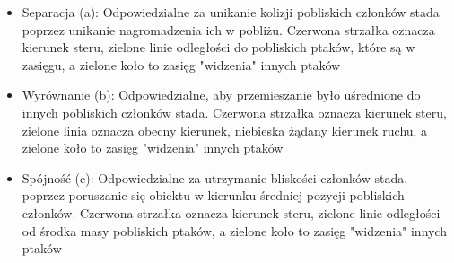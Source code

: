 \documentclass[a4paper,12pt,reqno]{article}
\begin{document}
\begin{itemize}
\item Separacja (a): Odpowiedzialne za unikanie kolizji pobliskich członków stada poprzez unikanie nagromadzenia ich w pobliżu. Czerwona strzałka oznacza kierunek steru, zielone linie odległości do pobliskich ptaków, które są w zasięgu, a zielone koło to zasięg "widzenia" innych ptaków
\item Wyrównanie (b): Odpowiedzialne, aby przemieszanie było uśrednione do innych pobliskich członków stada. Czerwona strzałka oznacza kierunek steru, zielone linia oznacza obecny kierunek, niebieska żądany kierunek ruchu, a zielone koło to zasięg "widzenia" innych ptaków
\item Spójność (c): Odpowiedzialne za utrzymanie bliskości członków stada, poprzez poruszanie się obiektu w kierunku średniej pozycji pobliskich członków. Czerwona strzałka oznacza kierunek steru, zielone linie odległości od środka masy pobliskich ptaków, a zielone koło to zasięg "widzenia" innych ptaków
\end{itemize}
\end{document}
